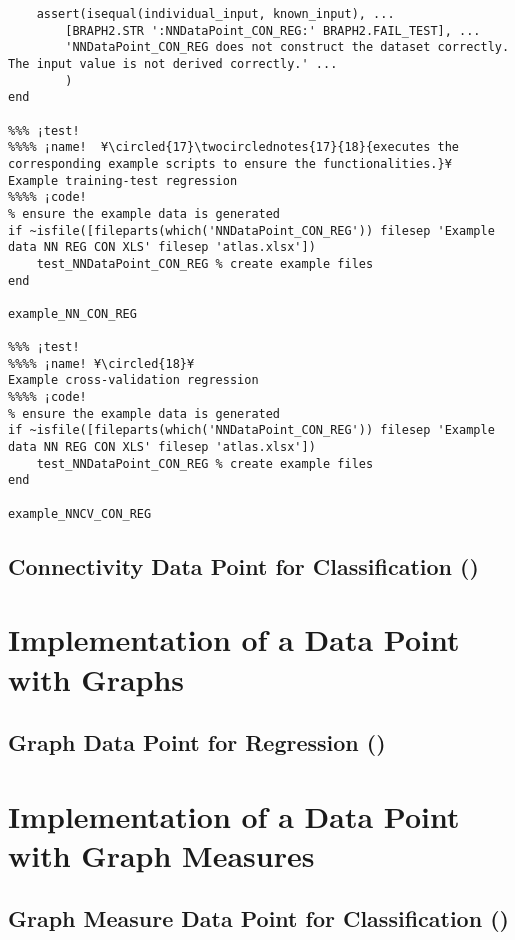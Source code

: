 \documentclass{tufte-handout}
\begin{document}
\begin{lstlisting}
    assert(isequal(individual_input, known_input), ...
        [BRAPH2.STR ':NNDataPoint_CON_REG:' BRAPH2.FAIL_TEST], ...
        'NNDataPoint_CON_REG does not construct the dataset correctly. The input value is not derived correctly.' ...
        )
end

%%% ¡test! 
%%%% ¡name!  ¥\circled{17}\twocirclednotes{17}{18}{executes the corresponding example scripts to ensure the functionalities.}¥
Example training-test regression
%%%% ¡code!
% ensure the example data is generated
if ~isfile([fileparts(which('NNDataPoint_CON_REG')) filesep 'Example data NN REG CON XLS' filesep 'atlas.xlsx'])
    test_NNDataPoint_CON_REG % create example files
end

example_NN_CON_REG

%%% ¡test! 
%%%% ¡name! ¥\circled{18}¥
Example cross-validation regression
%%%% ¡code!
% ensure the example data is generated
if ~isfile([fileparts(which('NNDataPoint_CON_REG')) filesep 'Example data NN REG CON XLS' filesep 'atlas.xlsx'])
    test_NNDataPoint_CON_REG % create example files
end

example_NNCV_CON_REG

\end{lstlisting}

\clearpage
\subsection{Connectivity Data Point for Classification ()}

\clearpage
\section{Implementation of a Data Point with Graphs}
\subsection{Graph Data Point for Regression ()}

\clearpage
\section{Implementation of a Data Point with Graph Measures}
\subsection{Graph Measure Data Point for Classification ()}


%
%
\end{document}
